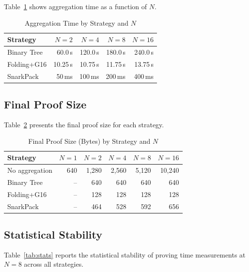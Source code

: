 Table~\ref{tab:agg-time} shows aggregation time as a function of $N$.

\begin{table}[htbp]
\centering
\caption{Aggregation Time by Strategy and $N$}
\label{tab:agg-time}
\begin{tabular}{@{}lrrrr@{}}
\toprule
\textbf{Strategy} & $N{=}2$ & $N{=}4$ & $N{=}8$ & $N{=}16$ \\
\midrule
Binary Tree   & 60.0\,s  & 120.0\,s & 180.0\,s & 240.0\,s \\
Folding+G16   & 10.25\,s & 10.75\,s & 11.75\,s & 13.75\,s \\
SnarkPack     & 50\,ms   & 100\,ms  & 200\,ms  & 400\,ms \\
\bottomrule
\end{tabular}
\end{table}

\subsection{Final Proof Size}

Table~\ref{tab:proof-size} presents the final proof size for each
strategy.

\begin{table}[htbp]
\centering
\caption{Final Proof Size (Bytes) by Strategy and $N$}
\label{tab:proof-size}
\begin{tabular}{@{}lrrrrr@{}}
\toprule
\textbf{Strategy} & $N{=}1$ & $N{=}2$ & $N{=}4$ & $N{=}8$ & $N{=}16$ \\
\midrule
No aggregation & 640 & 1,280 & 2,560 & 5,120 & 10,240 \\
Binary Tree    & --  & 640   & 640   & 640   & 640 \\
Folding+G16    & --  & 128   & 128   & 128   & 128 \\
SnarkPack      & --  & 464   & 528   & 592   & 656 \\
\bottomrule
\end{tabular}
\end{table}

\subsection{Statistical Stability}

Table~\ref{tab:stats} reports the statistical stability of proving time
measurements at $N{=}8$ across all strategies.

